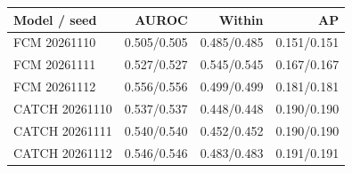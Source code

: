 \begin{tabular*}{\linewidth}{@{\extracolsep{\fill}}lrrr@{}}
\toprule
Model / seed & AUROC & Within & AP \\
\midrule
FCM 20261110 & 0.505/0.505 & 0.485/0.485 & 0.151/0.151 \\
FCM 20261111 & 0.527/0.527 & 0.545/0.545 & 0.167/0.167 \\
FCM 20261112 & 0.556/0.556 & 0.499/0.499 & 0.181/0.181 \\
CATCH 20261110 & 0.537/0.537 & 0.448/0.448 & 0.190/0.190 \\
CATCH 20261111 & 0.540/0.540 & 0.452/0.452 & 0.190/0.190 \\
CATCH 20261112 & 0.546/0.546 & 0.483/0.483 & 0.191/0.191 \\
\bottomrule
\end{tabular*}